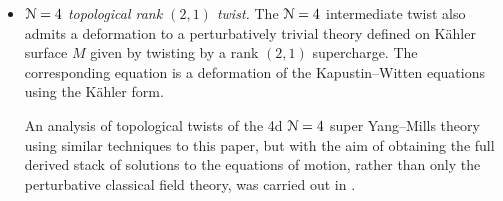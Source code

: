 \documentclass[10pt, oneside]{article}
\begin{document}
\begin{itemize}
\item \emph{$\mathcal N=4$ topological rank $(2, 1)$ twist.} The $\mathcal N=4$ intermediate twist also admits a deformation to a perturbatively trivial theory defined on K\"ahler surface $M$ given by twisting by a rank $(2, 1)$ supercharge. The corresponding equation is a deformation of the Kapustin--Witten equations using the K\"ahler form.


An analysis of topological twists of the 4d $\mathcal N=4$ super Yang--Mills theory using similar techniques to this paper, but with the aim of obtaining the full derived stack of solutions to the equations of motion, rather than only the perturbative classical field theory, was carried out in \cite{ElliottYoo1}.
\end{itemize}
\end{document}
